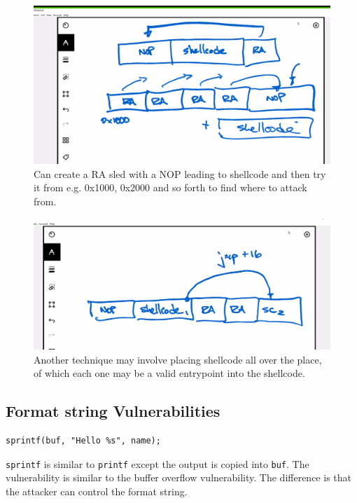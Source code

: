 \documentclass[../notes.tex]{subfiles}
\begin{document}
\begin{figure}[H]
    \centering
    \includegraphics[width=0.8\linewidth]{img/image_2023-01-16-18-37-29.png}
    \caption{Can create a RA sled with a NOP leading to shellcode and then try it from e.g. 0x1000, 0x2000 and so forth to find where to attack from.}



\end{figure}

\begin{figure}[H]
    \centering
    \includegraphics[width=0.8\linewidth]{img/image_2023-01-16-18-40-09.png}
    \caption{Another technique may involve placing shellcode all over the place, of which each one may be a valid entrypoint into the shellcode.}
\end{figure}



\subsection{Format string Vulnerabilities}
\begin{listing}[H]
\begin{verbatim}
sprintf(buf, "Hello %s", name);
\end{verbatim}
\end{listing}


\texttt{sprintf} is similar to \texttt{printf} except the output is copied into \texttt{buf}. The vulnerability is similar to the buffer overflow vulnerability. The difference is that the attacker can control the format string.
\end{document}
